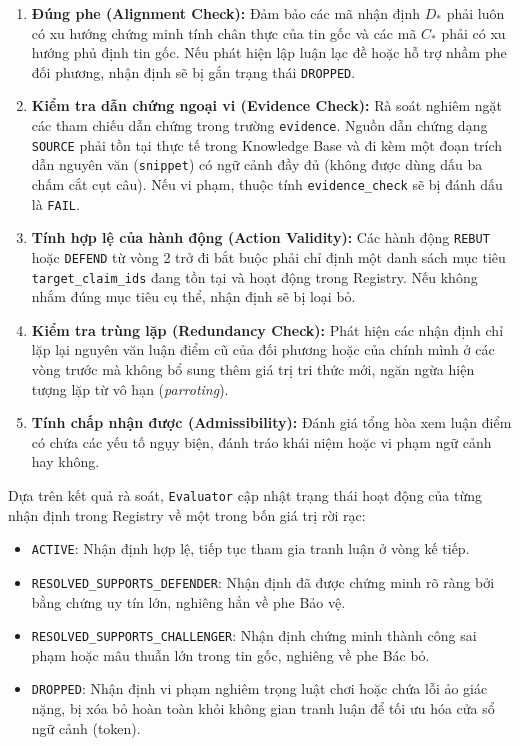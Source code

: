 \documentclass[12pt,a4paper]{report}
\begin{document}
\begin{enumerate}
    \item \textbf{Đúng phe (Alignment Check):} Đảm bảo các mã nhận định $D_*$ phải luôn có xu hướng chứng minh tính chân thực của tin gốc và các mã $C_*$ phải có xu hướng phủ định tin gốc. Nếu phát hiện lập luận lạc đề hoặc hỗ trợ nhầm phe đối phương, nhận định sẽ bị gắn trạng thái \texttt{DROPPED}.
    \item \textbf{Kiểm tra dẫn chứng ngoại vi (Evidence Check):} Rà soát nghiêm ngặt các tham chiếu dẫn chứng trong trường \texttt{evidence}. Nguồn dẫn chứng dạng \texttt{SOURCE} phải tồn tại thực tế trong Knowledge Base và đi kèm một đoạn trích dẫn nguyên văn (\texttt{snippet}) có ngữ cảnh đầy đủ (không được dùng dấu ba chấm cắt cụt câu). Nếu vi phạm, thuộc tính \texttt{evidence\_check} sẽ bị đánh dấu là \texttt{FAIL}.
    \item \textbf{Tính hợp lệ của hành động (Action Validity):} Các hành động \texttt{REBUT} hoặc \texttt{DEFEND} từ vòng 2 trở đi bắt buộc phải chỉ định một danh sách mục tiêu \texttt{target\_claim\_ids} đang tồn tại và hoạt động trong Registry. Nếu không nhắm đúng mục tiêu cụ thể, nhận định sẽ bị loại bỏ.
    \item \textbf{Kiểm tra trùng lặp (Redundancy Check):} Phát hiện các nhận định chỉ lặp lại nguyên văn luận điểm cũ của đối phương hoặc của chính mình ở các vòng trước mà không bổ sung thêm giá trị tri thức mới, ngăn ngừa hiện tượng lặp từ vô hạn (\textit{parroting}).
    \item \textbf{Tính chấp nhận được (Admissibility):} Đánh giá tổng hòa xem luận điểm có chứa các yếu tố ngụy biện, đánh tráo khái niệm hoặc vi phạm ngữ cảnh hay không.
\end{enumerate}

Dựa trên kết quả rà soát, \texttt{Evaluator} cập nhật trạng thái hoạt động của từng nhận định trong Registry về một trong bốn giá trị rời rạc:
\begin{itemize}
    \item \texttt{ACTIVE}: Nhận định hợp lệ, tiếp tục tham gia tranh luận ở vòng kế tiếp.
    \item \texttt{RESOLVED\_SUPPORTS\_DEFENDER}: Nhận định đã được chứng minh rõ ràng bởi bằng chứng uy tín lớn, nghiêng hẳn về phe Bảo vệ.
    \item \texttt{RESOLVED\_SUPPORTS\_CHALLENGER}: Nhận định chứng minh thành công sai phạm hoặc mâu thuẫn lớn trong tin gốc, nghiêng về phe Bác bỏ.
    \item \texttt{DROPPED}: Nhận định vi phạm nghiêm trọng luật chơi hoặc chứa lỗi ảo giác nặng, bị xóa bỏ hoàn toàn khỏi không gian tranh luận để tối ưu hóa cửa sổ ngữ cảnh (token).
\end{itemize}
\end{document}
